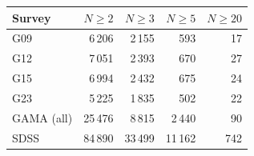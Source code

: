 \begin{tabular}{lrrrr}
\hline
Survey & $N \geq 2$ & $N \geq 3$ & $N \geq 5$ & $N \geq 20$ \\
\hline
G09 & 6\,206 & 2\,155 & 593 & 17 \\
G12 & 7\,051 & 2\,393 & 670 & 27 \\
G15 & 6\,994 & 2\,432 & 675 & 24 \\
G23 & 5\,225 & 1\,835 & 502 & 22 \\
GAMA (all) & 25\,476 & 8\,815 & 2\,440 & 90 \\
\hline
SDSS & 84\,890 & 33\,499 & 11\,162 & 742 \\
\hline
\end{tabular}
